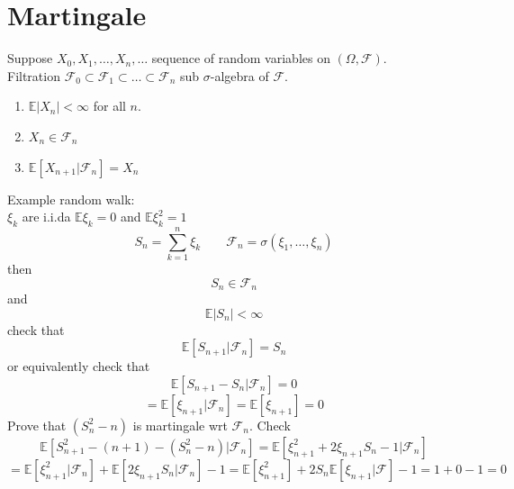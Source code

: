 \documentclass[11pt]{article}
\begin{document}
\section{Martingale}
Suppose $X_0, X_1,\dots,X_n,\dots$ sequence of random variables on $(\Omega, \mathcal{F})$. \\
Filtration $ \mathcal{F}_0 \subset \mathcal{F}_1 \subset \dots \subset \mathcal{F}_n$ sub $\sigma$-algebra of $ \mathcal{F}$.
\begin{enumerate}
    \item $ \mathbb{E}|X_n| < \infty$ for all $n$.
    \item  $X_n \in \mathcal{F}_n$
    \item $ \mathbb{E}[X_{n+1} | \mathcal{F}_n] =  X_n$
\end{enumerate}
Example
random walk: \\ $\xi_k$ are i.i.da $ \mathbb{E}\xi_k = 0$ and $ \mathbb{E}\xi_k^2 = 1$
\[
    S_n = \sum_{k=1}^{n}\xi_k \qquad \mathcal{F}_n = \sigma(\xi_1, \dots, \xi_n)
\] 
then
\[
S_n \in \mathcal{F}_n
\] 
and
\[
\mathbb{E}|S_n| < \infty
\] 
check that
\[
    \mathbb{E}[S_{n+1}| \mathcal{F}_n] = S_n
\] 
or equivalently check that
\[
    \mathbb{E}[S_{n+1}-S_n| \mathcal{F}_n] = 0
\] 
\[
    = \mathbb{E}[\xi_{n+1} | \mathcal{F}_n] =  \mathbb{E}[\xi_{n+1}] = 0
\] 
Prove that $(S_n^2-n)$ is martingale wrt $ \mathcal{F}_n$. Check
\[
    \mathbb{E}[S_{n+1}^2 - (n+1) - (S_n^2 - n)| \mathcal{F}_n] = \mathbb{E}[\xi_{n+1}^2 + 2 \xi_{n+1} S_n - 1| \mathcal{F}_n]
\] 
\[
    = \mathbb{E}[\xi_{n+1}^2 | \mathcal{F}_n] + \mathbb{E}[2 \xi_{n+1}S_n | \mathcal{F}_n] - 1 = \mathbb{E}[\xi_{n+1}^2] + 2S_n \mathbb{E}[\xi_{n+1}| \mathcal{F}] - 1 = 1 + 0 - 1 = 0
\] 
\end{document}
